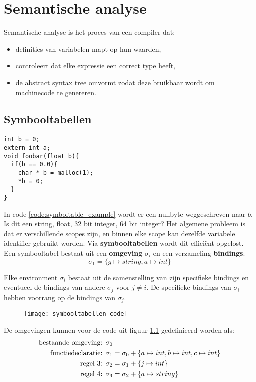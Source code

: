 \chapter{Semantische analyse}
\label{ch:semantische_analyse}

Semantische analyse is het proces van een compiler dat:
\begin{itemize}
	\item definities van variabelen mapt op hun waarden,
	\item controleert dat elke expressie een correct type heeft,
	\item de abstract syntax tree omvormt zodat deze bruikbaar wordt om machinecode te genereren.
\end{itemize}

\section{Symbooltabellen}
\begin{lstlisting}[caption={Het scopeprobleem.},captionpos=b,label={code:symboltable_example}]
int b = 0;
extern int a;
void foobar(float b){
  if(b == 0.0){
    char * b = malloc(1);
    *b = 0;
  }
}
\end{lstlisting}

In code \protect\ref{code:symboltable_example} wordt er een nullbyte weggeschreven naar $b$. Is dit een string, float, 32 bit integer, 64 bit integer? Het algemene probleem is dat er verschillende scopes zijn, en binnen elke scope kan dezelfde variabele identifier gebruikt worden. Via \textbf{symbooltabellen} wordt dit efficiënt opgelost.
Een symbooltabel bestaat uit een \textbf{omgeving} $\sigma_i$ en een verzameling \textbf{bindings}:
$$\sigma_1 = \{g \mapsto string, a \mapsto int\}$$

Elke environment $\sigma_i$ bestaat uit de samenstelling van zijn specifieke bindings en eventueel de bindings van andere $\sigma_{j}$ voor $j \neq i$. De specifieke bindings van $\sigma_i$ hebben voorrang op de bindings van $\sigma_{j}$.

\begin{figure}[h]
	\centering
	\texttt{[image: symbooltabellen\_code]}
	\caption{}
	\label{fig:symbooltabellen_code}
\end{figure}

De omgevingen kunnen voor de code uit figuur \ref{fig:symbooltabellen_code} gedefinieerd worden als:
\begin{equation*}
	\begin{split}
		\hbox{bestaande omgeving: } & \sigma_0 \\
		\hbox{functiedeclaratie: } & \sigma_1 = \sigma_0 + \{a \mapsto int, b \mapsto int, c \mapsto int\} \\ 
		\hbox{regel 3: } & \sigma_2 = \sigma_1 + \{j \mapsto int \} \\
		\hbox{regel 4: } & \sigma_3 = \sigma_2 + \{a \mapsto string \} \\
	\end{split}
\end{equation*}

